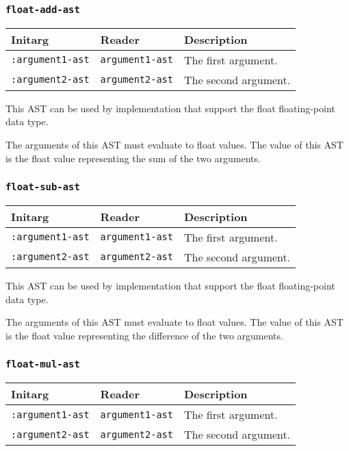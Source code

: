 \subsubsection{\texttt{float-add-ast}}
\label{sec-ast-float-add}

\begin{tabular}{|l|l|l|}
\hline
Initarg & Reader & Description\\
\hline\hline
\texttt{:argument1-ast} & \texttt{argument1-ast} & The first argument.\\
\hline
\texttt{:argument2-ast} & \texttt{argument2-ast} & The second argument.\\
\hline
\end{tabular}

This AST can be used by implementation that support the float
floating-point data type.  

The arguments of this AST must evaluate to float
values.  The value of this AST is the float value
representing the sum of the two arguments.

\subsubsection{\texttt{float-sub-ast}}
\label{sec-ast-float-sub}

\begin{tabular}{|l|l|l|}
\hline
Initarg & Reader & Description\\
\hline\hline
\texttt{:argument1-ast} & \texttt{argument1-ast} & The first argument.\\
\hline
\texttt{:argument2-ast} & \texttt{argument2-ast} & The second argument.\\
\hline
\end{tabular}

This AST can be used by implementation that support the float
floating-point data type.  

The arguments of this AST must evaluate to float
values.  The value of this AST is the float value
representing the difference of the two arguments.

\subsubsection{\texttt{float-mul-ast}}
\label{sec-ast-float-mul}

\begin{tabular}{|l|l|l|}
\hline
Initarg & Reader & Description\\
\hline\hline
\texttt{:argument1-ast} & \texttt{argument1-ast} & The first argument.\\
\hline
\texttt{:argument2-ast} & \texttt{argument2-ast} & The second argument.\\
\hline
\end{tabular}

